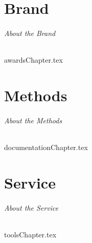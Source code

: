 \documentclass{book}  %
\begin{document}
\frontmatter %
	\maketitle %
	\tableofcontents %
	\clearpage %
\mainmatter %

	
	\part{Brand} %
		\paragraph{About the Brand}	
		{awardsChapter.tex}	
	
	\part{Methods} %
	    \paragraph{About the Methods}
		{documentationChapter.tex}	
			
	\part{Service} %
	    \paragraph{About the Service}
		{toolsChapter.tex}
\end{document}
